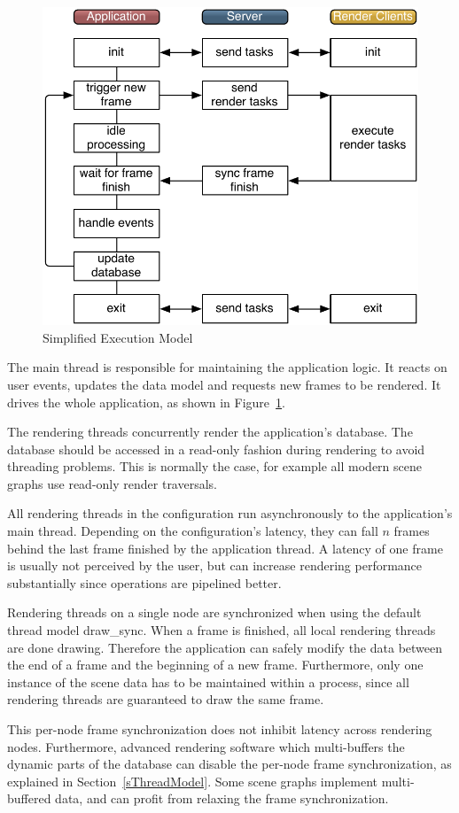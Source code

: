 \documentclass[10pt,a4]{scrartcl}
\newcommand{\fig}[1]{Figure~\ref{#1}}
\newcommand{\sref}[1]{Section~\ref{#1}}
\begin{document}
\begin{figure}
  \includegraphics[width=.618\textwidth]{images/model.pdf}
  {\caption{\label{fModel}Simplified Execution Model}}
\end{figure}
The main thread is responsible for maintaining the application logic. It
reacts on user events, updates the data model and requests new frames to
be rendered. It drives the whole application, as shown in \fig{fModel}.

The rendering threads concurrently render the application's
database. The data\-base should be accessed in a read-only fashion
during rendering to avoid threading problems. This is normally the case,
for example all modern scene graphs use read-only render traversals.

All rendering threads in the configuration run asynchronously to the
application's main thread. Depending on the configuration's latency,
they can fall $n$ frames behind the last frame finished by the
application thread. A latency of one frame is usually not perceived by
the user, but can increase rendering performance substantially since
operations are pipelined better.

Rendering threads on a single node are synchronized when using the
default thread model \textsf{draw\_sync}. When a frame is finished, all
local rendering threads are done drawing. Therefore the application can
safely modify the data between the end of a frame and the beginning of a
new frame. Furthermore, only one instance of the scene data has to be
maintained within a process, since all rendering threads are guaranteed
to draw the same frame.

This per-node frame synchronization does not inhibit latency across
rendering nodes. Furthermore, advanced rendering software which
multi-buffers the dynamic parts of the database can disable the per-node
frame synchronization, as explained in \sref{sThreadModel}. Some scene
graphs implement multi-buffered data, and can profit from relaxing the
frame synchronization.
\end{document}
